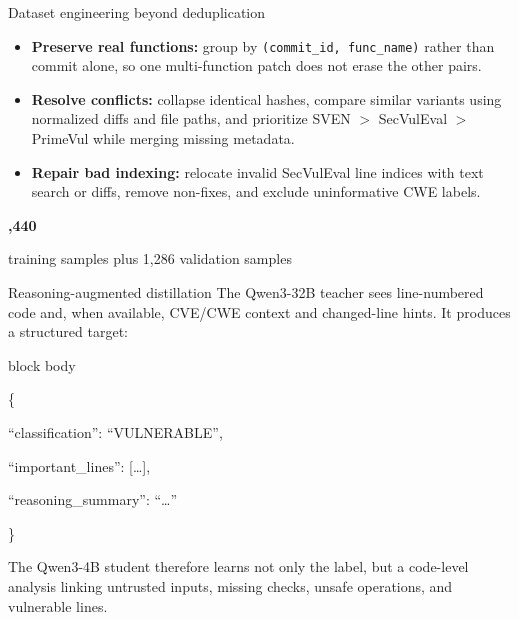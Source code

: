 \documentclass[final]{beamer}
\begin{document}
\begin{frame}[t]
\begin{center}
\begin{minipage}[t]{0.306\textwidth}
\begin{posterblock}{Dataset engineering beyond deduplication}
\begin{itemize}
  \item \textbf{Preserve real functions:} group by \texttt{(commit\_id, func\_name)} rather than commit alone, so one multi-function patch does not erase the other pairs.
  \item \textbf{Resolve conflicts:} collapse identical hashes, compare similar variants using normalized diffs and file paths, and prioritize SVEN $>$ SecVulEval $>$ PrimeVul while merging missing metadata.
  \item \textbf{Repair bad indexing:} relocate invalid SecVulEval line indices with text search or diffs, remove non-fixes, and exclude uninformative CWE labels.
\end{itemize}
\vspace{0.2em}
\centering
{\color{blue}\bfseries\fontsize{32}{36},440}\par training samples
\vspace{0.15em}
{\color{muted}\fontsize{21}{25}\selectfont plus 1,286 validation samples}
\end{posterblock}
\end{minipage}\hfill%
\begin{minipage}[t]{0.306\textwidth} %
\vspace{0pt}
\begin{posterblock}{Reasoning-augmented distillation}
The Qwen3-32B teacher sees line-numbered code and, when available, CVE/CWE context and changed-line hints. It produces a structured target:
\vspace{0.35em}
\begin{beamercolorbox}[rounded=true,sep=0.6cm]{block body}
{\ttfamily\fontsize{20}{25}\selectfont
\{\par
\quad ``classification'': ``VULNERABLE'',\par
\quad ``important\_lines'': [\ldots],\par
\quad ``reasoning\_summary'': ``\ldots''\par
\}}
\end{beamercolorbox}
\vspace{0.35em}
The Qwen3-4B student therefore learns not only the label, but a code-level analysis linking untrusted inputs, missing checks, unsafe operations, and vulnerable lines.
\end{posterblock}


\end{minipage}
\end{center}
\end{frame}
\end{document}
